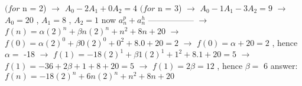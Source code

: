 \documentclass[a4 paper]{article}
\numberwithin{equation}{section}
\newcommand{\0}{\mathbf{0}}
\begin{document}
$(for$ n = 2) $\to$ $A_0 - 2A_1 + 0A_2 =  4$ \newline \newline
$(for$ n = 3) $\to$ $A_0 - 1A_1 - 3A_2 =  9$ \newline \newline
$\to$ $A_0 = 20$ , $A_1 = 8$ , $ A_2 = 1$  \newline \newline
now $a_n^p + a_n^h$ \newline
----------------- \newline
$\to$ $f(n) = \alpha(2)^n + \beta n(2)^n + n^2 + 8n + 20$  \newline \newline
$\to$ $f(0) = \alpha(2)^0 + \beta 0(2)^0 + 0^2 + 8.0 + 20 = 2$  \newline \newline
$\to$ $f(0) = \alpha + 20 = 2$   , hence   $\alpha =$ -18  \newline \newline
$\to$ $f(1) = -18(2)^1 + \beta 1(2)^1 + 1^2 + 8.1 + 20 = 5$ \newline \newline
$\to$ $f(1) = -36 + 2\beta + 1 + 8 + 20 = 5$ \newline \newline
$\to$ $f(1) = 2\beta = 12$ , hence $\beta =$ 6 \newline \newline
answer: $f(n) = -18(2)^n + 6n(2)^n + n^2 + 8n + 20$ \newline
\end{document}
